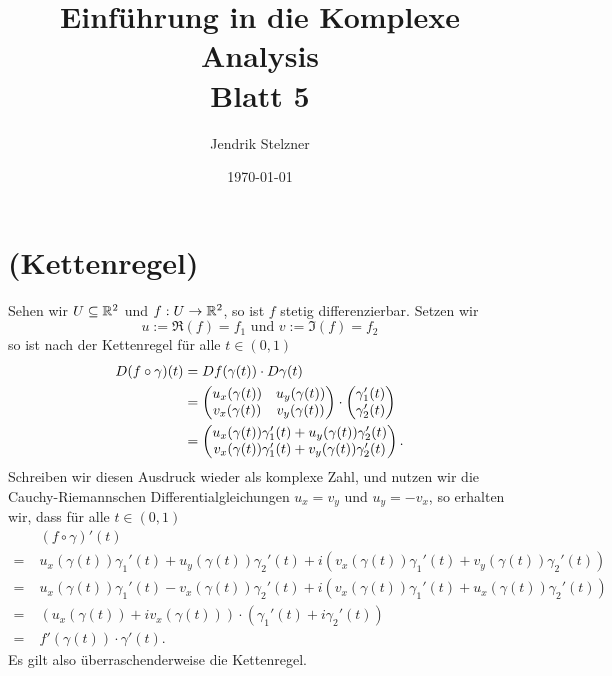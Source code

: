 \documentclass[a4paper,10pt]{article}
\title{\sc Einführung in die Komplexe Analysis \\ \Large Blatt 5}
\author{Jendrik Stelzner}
\date{\today}
\begin{document}
\maketitle





\section{(Kettenregel)}
Sehen wir $U \subseteq \mathbb{R}^2$ und $f : U \to \mathbb{R}^2$, so ist $f$ stetig differenzierbar. Setzen wir
\[
 u := \Re(f) = f_1 \text{ und } v := \Im(f) = f_2
\]
so ist nach der Kettenregel für alle $t \in (0,1)$
\begin{align*}
 D(f \circ \gamma)(t)
 &= Df(\gamma(t)) \cdot D\gamma(t) \\
 &= \begin{pmatrix}u_x(\gamma(t)) & u_y(\gamma(t)) \\ v_x(\gamma(t)) & v_y(\gamma(t))\end{pmatrix} \cdot \begin{pmatrix}\gamma_1'(t) \\ \gamma_2'(t)\end{pmatrix} \\
 &= \begin{pmatrix}u_x(\gamma(t)) \gamma_1'(t) + u_y(\gamma(t)) \gamma_2'(t) \\ v_x(\gamma(t)) \gamma_1'(t) + v_y(\gamma(t)) \gamma_2'(t)\end{pmatrix}.
\end{align*}
Schreiben wir diesen Ausdruck wieder als komplexe Zahl, und nutzen wir die Cauchy-Riemannschen Differentialgleichungen $u_x = v_y$ und $u_y = -v_x$, so erhalten wir, dass für alle $t \in (0,1)$
\begin{align*}
  &\; (f \circ \gamma)'(t) \\
 =&\; u_x(\gamma(t)) \gamma_1'(t) + u_y(\gamma(t))\gamma_2'(t) + i(v_x(\gamma(t)) \gamma_1'(t) + v_y(\gamma(t)) \gamma_2'(t)) \\
 =&\; u_x(\gamma(t)) \gamma_1'(t) - v_x(\gamma(t))\gamma_2'(t) + i(v_x(\gamma(t)) \gamma_1'(t) + u_x(\gamma(t)) \gamma_2'(t)) \\
 =&\; (u_x(\gamma(t))+iv_x(\gamma(t))) \cdot (\gamma_1'(t)+i\gamma_2'(t)) \\
 =&\; f'(\gamma(t)) \cdot \gamma'(t).
\end{align*}
Es gilt also überraschenderweise die Kettenregel.
\end{document}
